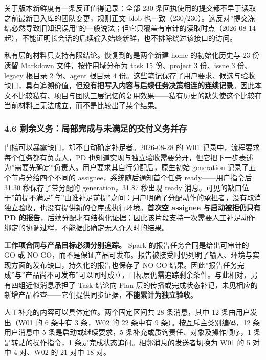 \documentclass[
]{article}
\begin{document}
关于版本新鲜度有一条反证值得记录：全部 230
条回执使用的提交都不早于读取之前最新已入库的团队变更，规则正文 blob
也一致（230/230）。这反对''提交冻结必然导致旧知识误用''的一般说法；但它只覆盖有审计的读取时点（2026-08-14
起），不能证明长会话的后续输入始终新鲜，也不排除绕过该接口的访问。

私有层的材料只支持有限结论。恢复到的是两个新建 home 的初始化历史与 23
份遗留 Markdown 文件，按作用域分布为 task 15 份、project 3 份、issue 3
份、legacy 根目录 2 份、agent 根目录 4
份。这些笔记保存了用户要求、候选与验收缺口，具有追溯价值，但\textbf{没有把写入内容与后续任务决策相连的连续记录}。因此本文不比较私有、项目与团队三层记忆的复用效果------私有历史的缺失使这个比较在当前材料上无法成立，而不是比较出了某个结果。

\subsubsection{4.6
剩余义务：局部完成与未满足的交付义务并存}\label{ux5269ux4f59ux4e49ux52a1ux5c40ux90e8ux5b8cux6210ux4e0eux672aux6ee1ux8db3ux7684ux4ea4ux4ed8ux4e49ux52a1ux5e76ux5b58}

门槛可以暴露缺口，却不自动确定补足者。2026-08-28 的 W01
记录中，流程要求每个任务都有负责人，PD
也知道实现与独立验收需要分开，但它把下一步表述为''需要先确定''负责人。用户要求其自行分配后，原生初始
generation 记录了五个节点分给四个不同的 assignee，系统随后通知首个任务
ready------用户指令后 31.30 秒保存了带分配的 generation，31.87 秒出现
ready
消息。可见的缺口位于''前提不满足''与''由谁补足前提''之间：用户明确了分配动作的承担者，没有取消独立验收，也没有提供新的仓库或执行环境。\textbf{首次空
assignee 与启动被拒仍只有 PD
的报告}，后续分配才有结构化证据；因此该片段支持一次需要人工补足动作绑定的协调过程，不能据此确定无人介入时的结果。

\textbf{工作项合同与产品目标必须分别追踪。} Spark
的报告任务合同是给出可审计的 GO 或
NO-GO，而不是保证产品可发布。报告被接受时仍列明了输入、环境与实现方面的发布缺口，持久化的报告也保存了
NO-GO
结果。因此''报告任务完成''与''产品尚不可发布''可以同时成立，目标层仍需追踪剩余条件。与此相对，另有四组近似消息承担了
Task 结论向 Plan
层的传播或完成状态补记，未见相应的新增产品检查------它们提供同步证据，\textbf{不能累计为独立验收}。

人工补充的内容可以具体定位。两个固定区间共 28 条消息，其中 12
条由用户发出（W01 的 6 条中有 3 条，W02 的 22 条中有 9
条）。按互斥主类别编码，12 条用户消息中 5 条是启动或继续要求，5
条补充或质询责任、对象及操作顺序，1 条是转贴的操作指令，1
条是完成状态追问。相邻消息的发送者切换为 W01 的 5 对中 4 对、W02 的 21
对中 18 对。
\end{document}
